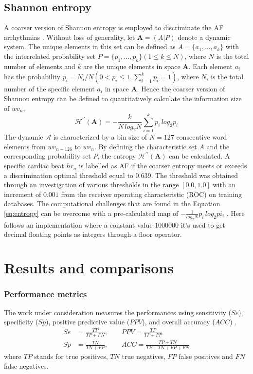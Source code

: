 \subsection{Shannon entropy}
\label{sec:entropy}
A coarser version of Shannon entropy is employed to discriminate the AF arrhythmias . Without loss of generality, let $\mathbf{A} = (A|P)$ denote a dynamic system. The unique elements in this set can be defined as $A = \{a_1, \ldots, a_k\}$ with the interrelated probability set $P = \{p_1, \ldots, p_k\} (1 \le k \le N)$, where $N$ is the total number of elements and $k$ are the unique elements in space $\mathbf{A}$. Each element $a_i$ has the probability $p_i = N_i/N (0 < p_i \le 1, \sum_{i=1}^{k}p_i=1)$, where $N_i$ is the total number of the specific element $a_i$ in space $\mathbf{A}$. Hence the coarser version of Shannon entropy can be defined to quantitatively calculate the information size of $wv_n$,
\begin{equation}\label{eq:entropy}
\mathcal{H}^{\prime\prime} (\mathbf{A}) = -\frac{k}{N \, log_2 N} \sum_{i=1}^{k}p_i \, log_2 p_i
\end{equation}
The dynamic $\mathcal{A}$ is characterized by a bin size of $N=127$ consecutive word elements from $wv_{n-126}$ to $wv_n$. By defining the characteristic set $A$ and the corresponding probability set $P$, the entropy $\mathcal{H}^{\prime\prime} (\mathbf{A})$ can be calculated. A specific cardiac beat $hr_n$ is labelled as AF if the coarser entropy meets or exceeds a discrimination optimal threshold equal to $0.639$. The threshold was obtained through an investigation of various thresholds in the range $[0.0, 1.0]$ with an increment of $0.001$ from the receiver operating characteristic (ROC) on training databases. 
The computational challenges that are found in the Equation \ref{eq:entropy} can be overcome with a pre-calculated map of $-\frac{1}{log_2 N}p_i \, log_2 pi_i$ \cite[p. 4]{zhou2015}. Here follows an implementation where a constant value $1000000$ it's used to get decimal floating points as integers through a floor operator.

\section{Results and comparisons}
\subsubsection{Performance metrics}
The work under consideration measures the performances using sensitivity ($Se$), specificity ($Sp$), positive predictive value ($PPV$), and overall accuracy ($ACC$) \cite[p. 6]{zhou2015}.
\begin{equation}
\label{eq:metrics}
\begin{aligned} S e &=\frac{T P}{T P+F N},\qquad P P V=\frac{T P}{T P+F P} \\ S p &=\frac{T N}{T N+F P}, \qquad A C C=\frac{T P+T N}{T P+T N+F P+F N} \end{aligned}
\end{equation}
where $TP$ stands for true positives, $TN$ true negatives, $FP$ false positives and $FN$ false negatives.

